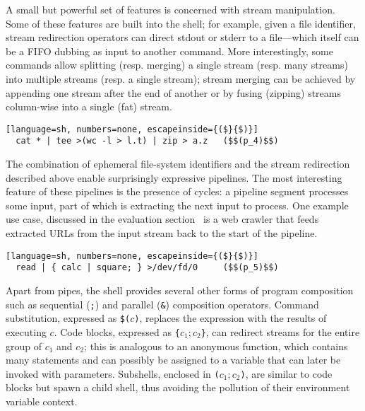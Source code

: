 \documentclass[sigplan,10pt,review,anonymous]{acmart}
\newcommand{\ttt}[1]{\texttt{\small #1}}
\begin{document}
A small but powerful set of features is concerned with stream manipulation.
Some of these features are built into the shell;
  for example, given a file identifier, stream redirection operators can direct stdout or stderr to a file---which itself can be a FIFO dubbing as input to another command.
More interestingly, some commands allow splitting (resp. merging) a single stream (resp. many streams) into multiple streams (resp. a single stream);
  stream merging can be achieved by appending one stream after the end of another or by fusing (zipping) streams column-wise into a single (fat) stream.

\smallskip
\begin{lstlisting}[language=sh, numbers=none, escapeinside={($}{$)}]
  cat * | tee >(wc -l > l.t) | zip > a.z   ($$(p_4)$$)
\end{lstlisting}
\smallskip

\noindent
The combination of ephemeral file-system identifiers and the stream redirection described above enable surprisingly expressive pipelines. %
The most interesting feature of these pipelines is the presence of cycles:
  a pipeline segment processes some input, part of which is extracting the next input to process.
One example use case, discussed in the evaluation section~ is a web crawler that feeds extracted URLs from the input stream back to the start of the pipeline.

\smallskip
\begin{lstlisting}[language=sh, numbers=none, escapeinside={($}{$)}]
  read | { calc | square; } >/dev/fd/0     ($$(p_5)$$)
\end{lstlisting}
\smallskip

\noindent
Apart from pipes, the \unix shell provides several other forms of program composition such as sequential (\ttt{;}) and parallel (\ttt{\&}) composition operators.
Command substitution, expressed as \ttt{\$($c$)}, replaces the expression with the results of executing $c$.
Code blocks, expressed as \ttt{\{$c_1; c_2$\}}, can redirect streams for the entire group of $c_1$ and $c_2$;
  this is analogous to an anonymous function, which contains many statements and can possibly be assigned to a variable that can later be invoked with parameters.
Subshells, enclosed in \ttt{($c_1; c_2$)}, are similar to code blocks but spawn a child shell, thus avoiding the pollution of their environment variable context. %
\end{document}
